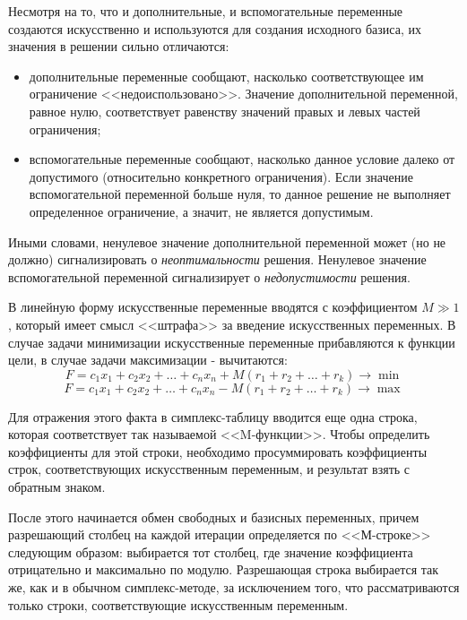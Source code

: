 \documentclass[a4paper,12pt]{report}
\begin{document}
Несмотря на то, что и дополнительные, и вспомогательные переменные создаются искусственно и используются для создания исходного базиса, их значения в решении сильно отличаются:
\begin{itemize}
\item дополнительные переменные сообщают, насколько соответствующее им ограничение <<недоиспользовано>>. Значение дополнительной переменной, равное нулю, соответствует равенству значений правых и левых частей ограничения;
\item вспомогательные переменные сообщают, насколько данное условие далеко от допустимого (относительно конкретного ограничения). Если значение вспомогательной переменной больше нуля, то данное решение не выполняет определенное ограничение, а значит, не является допустимым.
\end{itemize}

Иными словами, ненулевое значение дополнительной переменной может (но не должно) сигнализировать о \textit{неоптимальности} решения. Ненулевое значение вспомогательной переменной сигнализирует о \textit{недопустимости} решения.

В линейную форму искусственные переменные вводятся с коэффициентом $M \gg 1$, который имеет смысл <<штрафа>> за введение искусственных переменных. В случае задачи минимизации искусственные переменные прибавляются к функции цели, в случае задачи максимизации - вычитаются:
\begin{equation*}
F = c_{1}x_{1} + c_{2}x_{2} + \ldots + c_{n}x_{n} + M(r_{1} + r_{2} + \ldots + r_{k}) \rightarrow \min
\end{equation*}
\begin{equation*}
F = c_{1}x_{1} + c_{2}x_{2} + \ldots + c_{n}x_{n} - M(r_{1} + r_{2} + \ldots + r_{k}) \rightarrow \max
\end{equation*}

Для отражения этого факта в симплекс-таблицу вводится еще одна строка, которая соответствует так называемой <<M-функции>>. Чтобы определить коэффициенты для этой строки, необходимо просуммировать коэффициенты строк, соответствующих искусственным переменным, и результат взять с обратным знаком. 

После этого начинается обмен свободных и базисных переменных, причем разрешающий столбец на каждой итерации определяется по <<М-строке>> следующим образом: выбирается тот столбец, где значение коэффициента отрицательно и максимально по модулю. Разрешающая строка выбирается так же, как и в обычном симплекс-методе, за исключением того, что рассматриваются только строки, соответствующие искусственным переменным.
\end{document}
